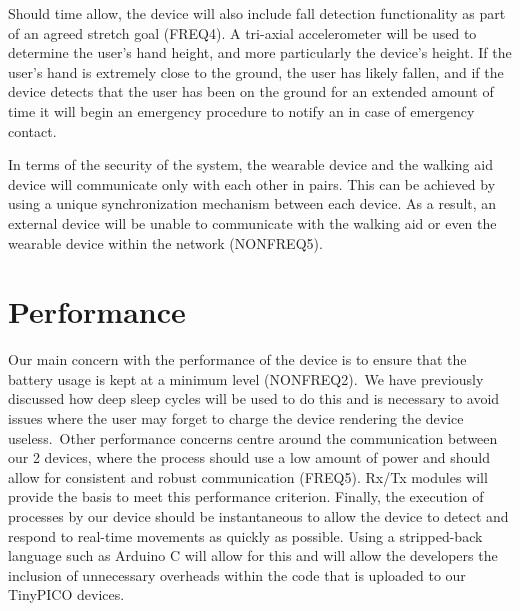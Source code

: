         Should time allow, the device will also include fall detection functionality as part of an agreed stretch goal
        (FREQ4). A tri-axial accelerometer will be used to determine the user's hand height, and more particularly the
        device's height. If the user's hand is extremely close to the ground, the user has likely fallen, and
        if the device detects that the user has been on the ground for an extended amount of time it will begin an
        emergency procedure to notify an in case of emergency contact.

        In terms of the security of the system, the wearable device and the walking aid device will communicate only
        with each other in pairs. This can be achieved by using a unique synchronization mechanism between each device.
        As a result, an external device will be unable to communicate with the walking aid or even the wearable device
        within the network (NONFREQ5).

    \section{Performance}

        Our main concern with the performance of the device is to ensure that the battery usage is kept at a minimum
        level (NONFREQ2).\ We have previously discussed how deep sleep cycles will be used to do this and is necessary to
        avoid issues where the user may forget to charge the device rendering the device useless.\ Other performance
        concerns centre around the communication between our 2 devices, where the process should use a low amount of
        power and should allow for consistent and robust communication (FREQ5). Rx/Tx modules will provide the basis to
        meet this performance criterion. Finally, the execution of processes by our device should be instantaneous to
        allow the device to detect and respond to real-time movements as quickly as possible. Using a stripped-back
        language such as Arduino C will allow for this and will allow the developers the inclusion of unnecessary
        overheads within the code that is uploaded to our TinyPICO devices.
